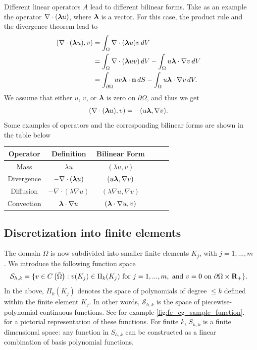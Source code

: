 \documentclass[oneside,a4paper,11pt]{report}
\begin{document}
Different linear operators $A$ lead to different bilinear forms. Take as an example the operator $\nabla \cdot (\bm \lambda u)$, where $\bm \lambda$ is a vector. For this case, the product rule and the divergence theorem lead to
\begin{align}
    \label{eq:fe_product_and_divergence}
    (\nabla \cdot (\bm \lambda u), v) &= \int_\Omega \nabla \cdot (\bm \lambda u) v \, dV \nonumber \\
    &= \int_\Omega \nabla \cdot (\bm \lambda uv) \, dV - \int_\Omega u \bm \lambda \cdot \nabla v \, dV \nonumber \\
    &= \int_{\partial \Omega} uv \bm \lambda \cdot \mathbf{n} \, dS - \int_\Omega u \bm \lambda \cdot \nabla v \, dV.
\end{align}
We assume that either $u$, $v$, or $\bm \lambda$ is zero on $\partial \Omega$, and thus we get
\begin{equation}
    \label{eq:fe_sample_bilinear_form}
    (\nabla \cdot (\bm \lambda u), v) = -(u \bm \lambda, \nabla v).
\end{equation}
Some examples of operators and the corresponding bilinear forms are shown in the table below 
\begin{center}
\begin{tabular}{Sc|Sc|Sc}
    Operator & Definition & Bilinear Form \\
    \hline
    Mass & $ \lambda u $ & $(\lambda u, v)$ \\
    \hline
    Divergence & $-\nabla \cdot (\bm \lambda u)$ & $(u\bm \lambda, \nabla v) $ \\
    \hline
    Diffusion & $-\nabla \cdot ( \lambda \nabla u)$ & $(\lambda \nabla u, \nabla v)$ \\
    \hline
    Convection & $ \bm \lambda \cdot \nabla u $ & $(\bm \lambda \cdot \nabla u, v)$ \\
\end{tabular}
\end{center}

\subsection{Discretization into finite elements}
The domain $\Omega$ is now subdivided into smaller finite elements $K_j$, with $j=1,...,m$. We introduce the following function space
\begin{equation}
    \label{eq:fe_cg_discrete_space}
    \mathcal{S}_{h,k} = \{v \in C \left ( \bar{\Omega} \right ) : v(K_j) \in \Pi_{k}(K_j) \text{ for } j=1,...,m, \text{ and } v = 0 \text{ on } \partial \Omega \times \mathbf{R}_+ \}.
\end{equation}
In the above, $\Pi_{k}(K_j)$ denotes the space of polynomials of degree $\le k$ defined within the finite element $K_j$. In other words, $\mathcal{S}_{h,k}$ is the space of piecewise-polynomial continuous functions. See for example \cref{fig:fe_cg_sample_function}. for a pictorial representation of these functions. For finite $k$, $S_{h,k}$ is a finite dimensional space: any function in $S_{h,k}$ can be constructed as a linear combination of basis polynomial functions.
\end{document}
